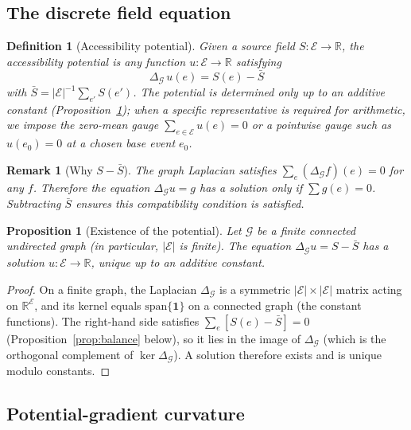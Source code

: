 \documentclass[12pt]{article}
\newtheorem{proposition}[theorem]{Proposition}
\newtheorem{definition}[theorem]{Definition}
\newtheorem{remark}[theorem]{Remark}
\newcommand{\Ecal}{\mathcal{E}}
\newcommand{\Gcal}{\mathcal{G}}
\begin{document}
\subsection{The discrete field equation}

\begin{definition}[Accessibility potential]\label{def:potential}
Given a source field $S: \Ecal \to \mathbb{R}$, the \textit{accessibility potential} is any function $u: \Ecal \to \mathbb{R}$ satisfying
\begin{equation}\label{eq:field}
    \boxed{\Delta_\Gcal\, u(e) = S(e) - \bar{S}}
\end{equation}
with $\bar{S} = |\Ecal|^{-1}\sum_{e'} S(e')$. The potential is determined only up to an additive constant (Proposition~\ref{prop:existence}); when a specific representative is required for arithmetic, we impose the zero-mean gauge $\sum_{e \in \Ecal} u(e) = 0$ or a pointwise gauge such as $u(e_0) = 0$ at a chosen base event $e_0$.
\end{definition}

\begin{remark}[Why $S - \bar{S}$]
The graph Laplacian satisfies $\sum_e (\Delta_\Gcal f)(e) = 0$ for any $f$. Therefore the equation $\Delta_\Gcal u = g$ has a solution only if $\sum g(e) = 0$. Subtracting $\bar{S}$ ensures this compatibility condition is satisfied.
\end{remark}

\begin{proposition}[Existence of the potential]\label{prop:existence}
Let $\Gcal$ be a finite connected undirected graph (in particular, $|\Ecal|$ is finite). The equation $\Delta_\Gcal u = S - \bar{S}$ has a solution $u: \Ecal \to \mathbb{R}$, unique up to an additive constant.
\end{proposition}

\begin{proof}
On a finite graph, the Laplacian $\Delta_\Gcal$ is a symmetric $|\Ecal| \times |\Ecal|$ matrix acting on $\mathbb{R}^\Ecal$, and its kernel equals $\mathrm{span}\{\mathbf{1}\}$ on a connected graph (the constant functions). The right-hand side satisfies $\sum_e [S(e)-\bar S] = 0$ (Proposition~\ref{prop:balance} below), so it lies in the image of $\Delta_\Gcal$ (which is the orthogonal complement of $\ker\Delta_\Gcal$). A solution therefore exists and is unique modulo constants.
\end{proof}

\subsection{Potential-gradient curvature}
\end{document}
